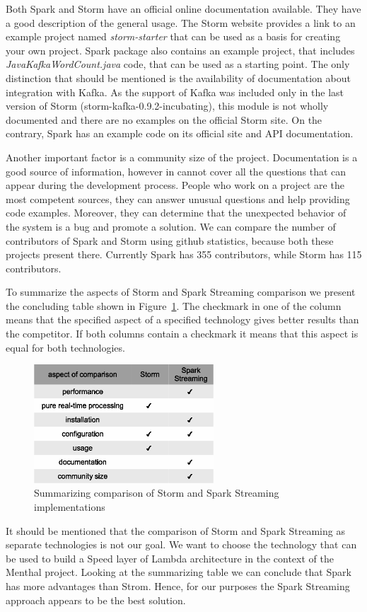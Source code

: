 Both Spark and Storm have an official online documentation available.
They have a good description of the general usage.
The Storm website provides a link to an example project named \textit{storm-starter} that can be used as a basis for creating your own project.
Spark package also contains an example project, that includes \textit{JavaKafkaWordCount.java} code, that can be used as a starting point. 
The only distinction that should be mentioned is the availability of documentation about integration with Kafka.
As the support of Kafka was included only in the last version of Storm (storm-kafka-0.9.2-incubating), this module is not wholly documented and there are no examples on the official Storm site.
On the contrary, Spark has an example code on its official site and API documentation. 

Another important factor is a community size of the project.
Documentation is a good source of information, however in cannot cover all the questions that can appear during the development process.
People who work on a project are the most competent sources, they can answer unusual questions and help providing code examples.
Moreover, they can determine that the unexpected behavior of the system is a bug and promote a solution.
We can compare the number of contributors of Spark and Storm using github statistics, because both these projects present there.
Currently Spark has 355 contributors, while Storm has 115 contributors. 

To summarize the aspects of Storm and Spark Streaming comparison we present the concluding table shown in Figure~\ref{fig:storm_spark_comparison}.
The checkmark in one of the column means that the specified aspect of a specified technology gives better results than the competitor.
If both columns contain a checkmark it means that this aspect is equal for both technologies.

\begin{figure}[h]
  \centering
  \includegraphics [width=0.6\textwidth]{images/storm_spark_comparison}
  \caption{Summarizing comparison of Storm and Spark Streaming implementations}
  \label{fig:storm_spark_comparison}
\end{figure}

It should be mentioned that the comparison of Storm and Spark Streaming as separate technologies is not our goal.
We want to choose the technology that can be used to build a Speed layer of Lambda architecture in the context of the Menthal project.
Looking at the summarizing table we can conclude that Spark has more advantages than Strom.
Hence, for our purposes the Spark Streaming approach appears to be the best solution.